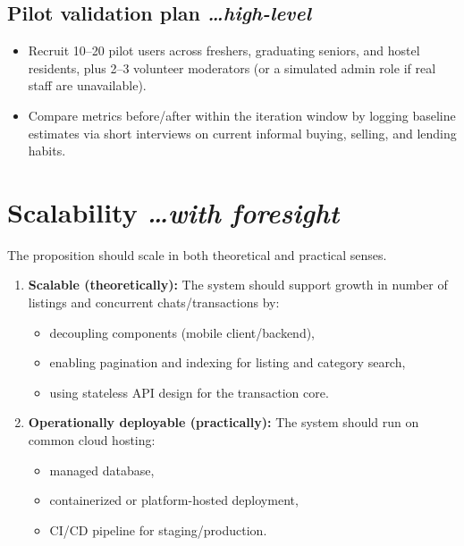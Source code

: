 \documentclass[11pt,a4paper]{article}
\newcommand{\BvrHint}[1]{%
  {\normalfont\normalsize\itshape\hfill #1}}
\begin{document}
\subsection{Pilot validation plan %
\BvrHint{\ldots high-level}}
\begin{itemize}[leftmargin=0.7cm]
    \item Recruit 10--20 pilot users across freshers, graduating seniors, and hostel residents, plus 2--3 volunteer moderators (or a simulated admin role if real staff are unavailable).
    \item Compare metrics before/after within the iteration window by logging baseline estimates via short interviews on current informal buying, selling, and lending habits.
\end{itemize}

\section{Scalability %
\BvrHint{\ldots with foresight}}
The proposition should scale in both theoretical and practical senses.

\begin{enumerate}[leftmargin=0.7cm]
    \item \textbf{Scalable (theoretically):} The system should support growth in number of listings and concurrent chats/transactions by:
    \begin{itemize}[leftmargin=0.7cm]
        \item decoupling components (mobile client/backend),
        \item enabling pagination and indexing for listing and category search,
        \item using stateless API design for the transaction core.
    \end{itemize}

    \item \textbf{Operationally deployable (practically):} The system should run on common cloud hosting:
    \begin{itemize}[leftmargin=0.7cm]
        \item managed database,
        \item containerized or platform-hosted deployment,
        \item CI/CD pipeline for staging/production.
    \end{itemize}
\end{enumerate}
\end{document}
